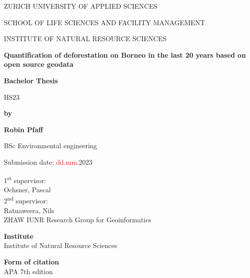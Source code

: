 \documentclass[
  letterpaper,
  DIV=11,
  numbers=noendperiod]{scrreprt}
\author{Robin Pfaff}
\date{2023-06-27}
\begin{document}
\begin{titlepage}
    \centering
    {\fontsize{12}{10}\selectfont ZURICH UNIVERSITY OF APPLIED SCIENCES\par}
    {\fontsize{12}{10}\selectfont SCHOOL OF LIFE SCIENCES AND FACILITY MANAGEMENT\par}
    {\fontsize{12}{10}\selectfont INSTITUTE OF NATURAL RESOURCE SCIENCES\par}
    \vspace{6cm}
    {\fontsize{14}{16}\bfseries Quantification of deforestation on Borneo in the last 20 years based on open source geodata\par}
    {\fontsize{12}{14}\bfseries Bachelor Thesis\par}
    {\fontsize{12}{14}\selectfont HS23\par}
    \vspace{2cm}
    {\fontsize{12}{14}\bfseries by\par}
    {\fontsize{12}{14}\bfseries Robin Pfaff\par}
    {\fontsize{12}{14}\selectfont BSc Environmental engineering\par}
    \vspace{2cm}
    {\fontsize{12}{14}\selectfont Submission date: \textcolor{red}{dd.mm}.2023\par}

    \vfill
    \begin{flushleft}
        1\textsuperscript{st} supervisor:\\
        Ochsner, Pascal\\
        2\textsuperscript{nd} supervisor:\\
        Ratnaweera, Nils\\
        ZHAW IUNR Research Group for Geoinformatics
    \end{flushleft}
\end{titlepage}

\clearpage
{}
\setcounter{page}{1}

\thispagestyle{empty}
\vspace*{\fill}


\vspace{0.5cm}

\noindent\textbf{Institute}\\
Institute of Natural Resource Sciences

\noindent\textbf{Form of citation}\\
APA 7th edition
\end{document}
